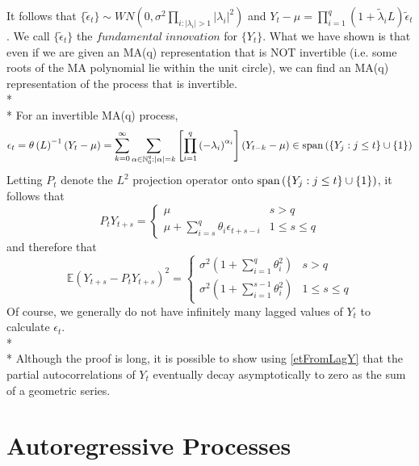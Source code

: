 \documentclass[11pt]{article}
\begin{document}
It follows that $\{\widetilde{\epsilon}_t \} \sim WN \left( 0, \sigma^2 \prod_{i:|\lambda_i|>1}|\lambda_i|^2 \right)$ and $Y_t - \mu = \prod_{i=1}^q \left( 1 + \widetilde{\lambda}_i L \right) \widetilde{\epsilon}_t$. We call $\{ \widetilde{\epsilon}_t \}$ the $fundamental\;innovation$ for $\{Y_t\}$. What we have shown is that even if we are given an MA(q) representation that is NOT invertible (i.e. some roots of the MA polynomial lie within the unit circle), we can find an MA(q) representation of the process that is invertible.
\\*
\\*
For an invertible MA(q) process,
\begin{equation} \label{etFromLagY}
\epsilon_t = \theta \left( L \right) ^ {-1} \left( Y_t - \mu \right)
= \sum_{k=0}^{\infty} \sum_{\alpha \in \mathbb{N}_0^q : |\alpha| = k} \left[ \prod_{i=1}^q \left( - \lambda_i \right)^{\alpha_i} \right] \left( Y_{t - k} - \mu \right)
\in \textup{span} \left( \{ Y_j : j \leq t \} \cup \{ 1 \} \right)
\end{equation}
Letting $P_t$ denote the $L^2$ projection operator onto $\textup{span} \left( \{ Y_j : j \leq t \} \cup \{ 1 \} \right)$, it follows that
\begin{equation}
P_t Y_{t+s} = \left\{\begin{matrix}
\mu & s > q\\ 
\mu + \sum_{i=s}^q \theta_i \epsilon_{t+s-i} & 1 \leq s \leq q  
\end{matrix}\right.
\end{equation}
and therefore that
\begin{equation}
\mathbb{E} \left( Y_{t+s} - P_t Y_{t+s} \right)^2
= \left\{\begin{matrix}
\sigma^2 \left( 1 + \sum_{i=1}^q \theta_i^2 \right) & s > q\\ 
\sigma^2 \left( 1 + \sum_{i=1}^{s-1} \theta_i^2 \right) & 1 \leq s \leq q  
\end{matrix}\right.
\end{equation}
Of course, we generally do not have infinitely many lagged values of $Y_t$ to calculate $\epsilon_t$.
\\*
\\*
Although the proof is long, it is possible to show using \eqref{etFromLagY} that the partial autocorrelations of $Y_t$ eventually decay asymptotically to zero as the sum of a geometric series.
\section{Autoregressive Processes}
\end{document}
